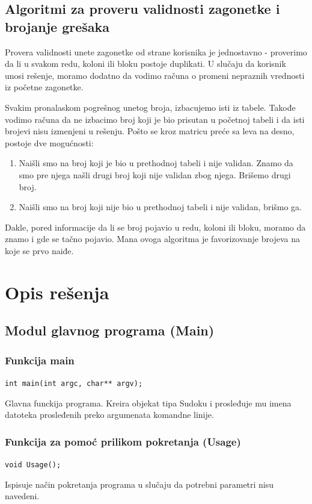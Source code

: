 \documentclass[a4paper]{article}
\begin{document}
    \subsection{Algoritmi za proveru validnosti zagonetke i brojanje grešaka}
    Provera validnosti unete zagonetke od strane korisnika je jednostavno - proverimo da li u svakom redu, koloni ili bloku postoje duplikati. 
    U slučaju da korisnik unosi rešenje, moramo dodatno da vodimo računa o promeni nepraznih vrednosti iz početne zagonetke.
    \par Svakim pronalaskom pogrešnog unetog broja, izbacujemo isti iz tabele. Tako\-đe vodimo računa da ne izbacimo broj koji je bio prisutan u početnoj tabeli i da isti brojevi nisu izmenjeni u rešenju.
    Pošto se kroz matricu preće sa leva na desno, postoje dve mogućnosti:
    \begin{enumerate}
        \item Naišli smo na broj koji je bio u prethodnoj tabeli i nije validan. Znamo da smo pre njega našli drugi broj koji nije validan zbog njega. Brišemo drugi broj.
        \item Naišli smo na broj koji nije bio u prethodnoj tabeli i nije validan, brišmo ga.
    \end{enumerate}
    Dakle, pored informacije da li se broj pojavio u redu, koloni ili bloku, moramo da znamo i gde se tačno pojavio. Mana ovoga algoritma je favorizovanje brojeva na koje
    se prvo naiđe.
    \newpage
    \section{Opis rešenja}
    
    \subsection{Modul glavnog programa (Main)}
    \subsubsection{Funkcija main}
    \texttt{int main(int argc, char** argv);}
    \par Glavna funckija programa. Kreira objekat tipa Sudoku i prosleđuje mu imena datoteka prosleđenih preko argumenata komandne linije.
    \subsubsection{Funkcija za pomoć prilikom pokretanja (Usage)}
    \texttt{void Usage();}
    \par Ispisuje način pokretanja programa u slučaju da potrebni parametri nisu navedeni.
\end{document}
